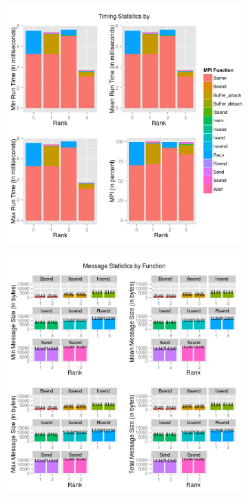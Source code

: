 \begin{figure}
\begin{subfigure}[b]{0.485\textwidth}
        \end{subfigure}\\
        \begin{subfigure}[b]{0.485\textwidth}
            \includegraphics[width=\textwidth]{include/pics/mpip/03_other}
        \end{subfigure}%
        \hspace{.2cm}
        \begin{subfigure}[b]{0.485\textwidth}
            \includegraphics[width=\textwidth]{include/pics/mpip/04_message}

\end{subfigure}
\end{figure}

